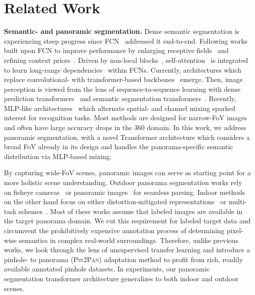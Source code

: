 \documentclass[final]{cvpr}
\begin{document}
\section{Related Work}
\noindent\textbf{Semantic- and panoramic segmentation.}
Dense semantic segmentation is experiencing steep progress since FCN~\cite{fcn} addressed it end-to-end. Following works built upon FCN to improve performance by enlarging receptive fields~\cite{hou2020strip,pspnet} and refining context priors~\cite{jin2021mining,context_prior}.
Driven by non-local blocks~\cite{nonlocal}, self-attention~\cite{attention} is integrated to learn long-range dependencies~\cite{danet,ccnet} within FCNs.
Currently, architectures which replace convolutional- with transformer-based backbones~\cite{vit,touvron2021deit} emerge.
Then, image perception is viewed from the lens of sequence-to-sequence learning with dense prediction transformers~\cite{swin,yuan2021hrformer} and semantic segmentation transformers~\cite{segmenter,setr}.
Recently, MLP-like architectures~\cite{asmlp,liu2021gmlp,mlp_mixer} which alternate spatial- and channel mixing sparked interest for recognition tasks.
Most methods are designed for narrow-FoV images and often have large accuracy drops in the 360 domain.
In this work, we address panoramic segmentation, with a novel Transformer architecture which considers a broad FoV already in its design and handles the panorama-specific semantic distribution via MLP-based mixing.

By capturing wide-FoV scenes, panoramic images can serve as starting point for a more holistic scene understanding.
Outdoor panorama segmentation works rely on fisheye cameras~\cite{restricted,omniscape,universal,woodscape} or panoramic images~\cite{pps,orhan2021semantic_outdoor_panoramic,synthetic,wildpass} for seamless  parsing.
Indoor methods on the other hand focus on either distortion-mitigated representations~\cite{spherical_unstructured_grids,spherephd,equivariant_networks} or multi-task schemes~\cite{pano_sfmlearner,hohonet,zhang2021deeppanocontext}. 
Most of these works assume that labeled images are available in the target panorama domain.
We cut this requirement for labeled target data and circumvent the prohibitively expensive annotation process of determining pixel-wise semantics in complex real-world surroundings.
Therefore, unlike previous works, we look through the lens of unsupervised transfer learning and introduce a pinhole- to panorama (\textsc{Pin2Pan}) adaptation method to profit from rich, readily available annotated pinhole datasets.
In experiments, our panoramic segmentation transformer architecture generalizes to both indoor and outdoor scenes. 
\end{document}
